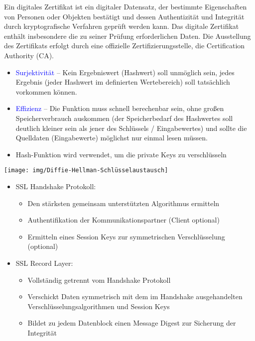 Ein digitales Zertifikat ist ein digitaler Datensatz, der bestimmte Eigenschaften von Personen oder Objekten bestätigt und dessen Authentizität und Integrität durch kryptografische Verfahren geprüft werden kann.
Das digitale Zertifikat enthält insbesondere die zu seiner Prüfung erforderlichen Daten.
Die Ausstellung des Zertifikats erfolgt durch eine offizielle Zertifizierungsstelle, die Certification Authority (CA).

\begin{itemize}
    \item \textcolor{blue}{Surjektivität} – Kein Ergebniswert (Hashwert) soll unmöglich sein, jedes Ergebnis (jeder Hashwert im definierten Wertebereich) soll tatsächlich vorkommen können.
    \item \textcolor{blue}{Effizienz} – Die Funktion muss schnell berechenbar sein, ohne großen Speicherverbrauch auskommen (der Speicherbedarf des Hashwertes soll deutlich kleiner sein als jener des Schlüssels / Eingabewertes) und sollte die Quelldaten (Eingabewerte) möglichst nur einmal lesen müssen.
    \item Hash-Funktion wird verwendet, um die private Keys zu verschlüsseln
\end{itemize}

\medskip
\texttt{[image: img/Diffie-Hellman-Schlüsselaustausch]}

\begin{itemize}
    \item SSL Handshake Protokoll:
    \begin{itemize}
        \item Den stärksten gemeinsam unterstützten Algorithmus ermitteln
        \item Authentifikation der Kommunikationspartner (Client optional)
        \item Ermitteln eines Session Keys zur symmetrischen Verschlüsselung (optional)
    \end{itemize}
    \item SSL Record Layer:
    \begin{itemize}
        \item Vollständig getrennt vom Handshake Protokoll
        \item Verschickt Daten symmetrisch mit dem im Handshake ausgehandelten Verschlüsselungsalgorithmen und Session Keys
        \item Bildet zu jedem Datenblock einen Message Digest zur Sicherung der Integrität
    \end{itemize}
\end{itemize}

